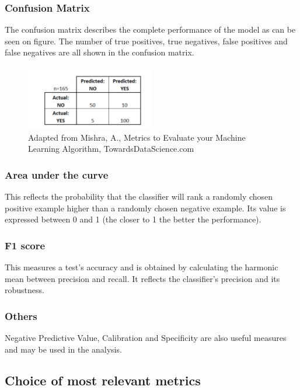 \subsubsection{Confusion Matrix}

The confusion matrix describes the complete performance of the model as can be seen on figure. The number of true positives, true negatives, false positives and false negatives are all shown in the confusion matrix.

\begin{figure}[H]
    \centering
    \includegraphics[width=0.5\textwidth]{ThesisTemplate/usingLatex/images/ConfusionMatrix.png}
    \caption{Adapted from Mishra, A., Metrics to Evaluate your Machine Learning Algorithm, TowardsDataScience.com}
    \label{fig:metrics}
\end{figure}

\subsubsection{Area under the curve}
This reflects the probability that the classifier will rank a randomly chosen positive example higher than a randomly chosen negative example. Its value is expressed between 0 and 1 (the closer to 1 the better the performance).


\subsubsection{F1 score}
This measures a test's accuracy and is obtained by calculating the harmonic mean between precision and recall. It reflects the classifier's precision and its robustness.

\subsubsection{Others}
Negative Predictive Value, Calibration and Specificity are also useful measures and may be used in the analysis.

\subsection{Choice of most relevant metrics}

